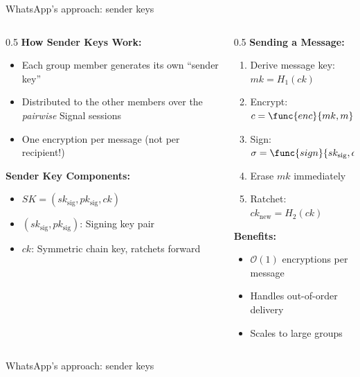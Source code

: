 \ifdefined\PRESENTATION\else\PassOptionsToClass{handout}{beamer}\fi\documentclass[aspectratio=169, lualatex]{beamer}
\begin{document}
\begin{frame}{WhatsApp's approach: sender keys}
	\begin{columns}[c]
		\begin{column}{0.5\textwidth}
			\textbf{How Sender Keys Work:}
			\begin{itemize}
				\item Each group member generates its own ``sender key''
				\item Distributed to the other members over the \textit{pairwise} Signal sessions
				\item One encryption per message (not per recipient!)
			\end{itemize}
			\textbf{Sender Key Components:}
			\begin{itemize}
				\item $SK = (sk_{\text{sig}}, pk_{\text{sig}}, ck)$
				\item $(sk_{\text{sig}}, pk_{\text{sig}})$: Signing key pair
				\item $ck$: Symmetric chain key, ratchets forward
			\end{itemize}
		\end{column}
		\begin{column}{0.5\textwidth}
			\textbf{Sending a Message:}
			\begin{enumerate}
				\item Derive message key: $mk = H_1(ck)$
				\item Encrypt: $c = \func{enc}{mk, m}$
				\item Sign: $\sigma = \func{sign}{sk_{\text{sig}}, c}$
				\item Erase $mk$ immediately
				\item Ratchet: $ck_{\text{new}} = H_2(ck)$
			\end{enumerate}
			\textbf{Benefits:}
			\begin{itemize}
				\item $\mathcal{O}(1)$ encryptions per message
				\item Handles out-of-order delivery
				\item Scales to large groups
			\end{itemize}
		\end{column}
	\end{columns}
\end{frame}

\begin{frame}{WhatsApp's approach: sender keys}
	\vspace{-0.4cm}
\end{frame}
\end{document}
